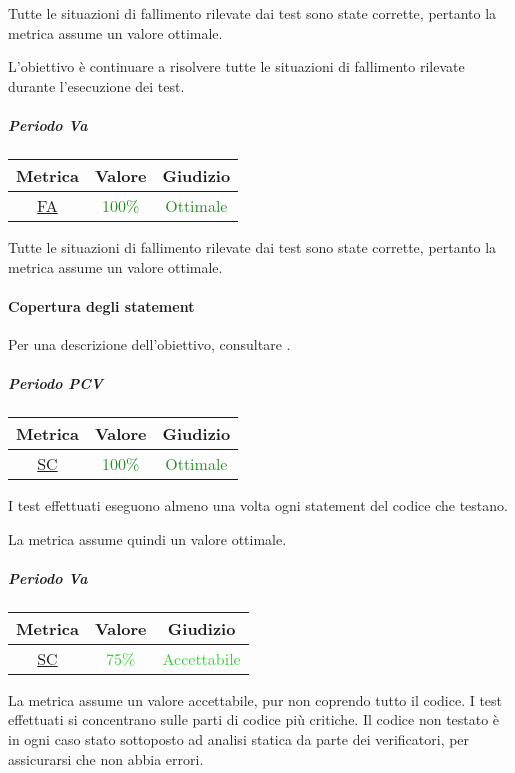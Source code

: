 			Tutte le situazioni di fallimento rilevate dai test sono state corrette, pertanto la metrica assume un valore ottimale.
			
			L'obiettivo è continuare a risolvere tutte le situazioni di fallimento rilevate durante l'esecuzione dei test.
			
			\subparagraph{Periodo Va}
			
			\begin{table}[H]
				\centering
				\begin{tabular}{  c | c | c}
					\hline
					\textbf{Metrica} & \textbf{Valore} & \textbf{Giudizio} \\
					\hline
					\hyperref[MMC]{FA}   & \textcolor{ForestGreen}{100\%}          & \textcolor{ForestGreen}{Ottimale}  \\ \hline
				\end{tabular} 
			\end{table}
			
			Tutte le situazioni di fallimento rilevate dai test sono state corrette, pertanto la metrica assume un valore ottimale.
			
			\newpage
			\paragraph{Copertura degli statement}
			Per una descrizione dell'obiettivo, consultare .
				\subparagraph{Periodo PCV}
				
				\begin{table}[H]
					\centering
					\begin{tabular}{  c | c | c}
						\hline
						\textbf{Metrica} & \textbf{Valore} & \textbf{Giudizio} \\
						\hline
						\hyperref[MMC]{SC}   & \textcolor{ForestGreen}{100\%}          & \textcolor{ForestGreen}{Ottimale}  \\ \hline
					\end{tabular} 
				\end{table}
			I test effettuati eseguono almeno una volta ogni statement del codice che testano. 
			
			La metrica assume quindi un valore ottimale.
			
			\subparagraph{Periodo Va}
			
			\begin{table}[H]
				\centering
				\begin{tabular}{  c | c | c}
					\hline
					\textbf{Metrica} & \textbf{Valore} & \textbf{Giudizio} \\
					\hline
					\hyperref[MMC]{SC}   & \textcolor{LimeGreen}{75\%}          & \textcolor{LimeGreen}{Accettabile}  \\ \hline
				\end{tabular} 
			\end{table}
			La metrica assume un valore accettabile, pur non coprendo tutto il codice. I test effettuati si concentrano sulle parti di codice più critiche. Il codice non testato è in ogni caso stato sottoposto ad analisi statica da parte dei verificatori, per assicurarsi che non abbia errori.
			\newpage
